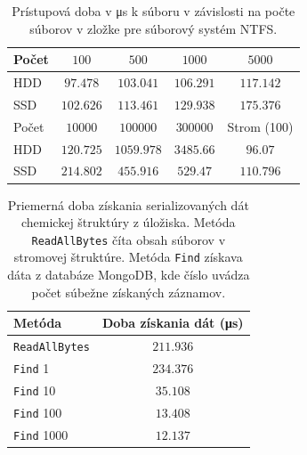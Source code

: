 \documentclass[slovak]{ExcelAtFIT} %
\begin{document}
\begin{table}[h]
	\vskip6pt
	\caption{Prístupová doba v \si{\micro\second} k súboru v závislosti na počte súborov v zložke pre súborový systém NTFS.}
	\centering
	\begin{tabular}{l|c|c|c|c}
		\toprule
		Počet & $100$ & $500$ & $1000$ & $5000$ \\
		\midrule
		HDD & $97.478$ & $103.041$ & $106.291$ & $117.142$ \\
		SSD & $102.626$ & $113.461$ & $129.938$ & $175.376$ \\
		\midrule[2px]
		Počet & $10000$ & $100000$ & $300000$ & Strom (100)\\
		\midrule
		HDD & $120.725$ & $1059.978$ & $3485.66$ & $96.07$
		 \\
		SSD & $214.802$ & $455.916$ & $529.47$ & $110.796$ \\
		\bottomrule
	\end{tabular}
	\label{tab:disk_access}
\end{table}

\begin{table}[h]
	\vskip6pt
	\caption{Priemerná doba získania serializovaných dát che\-mic\-kej štruktúry z úložiska. Metóda \texttt{ReadAllBytes} číta obsah súborov v stromovej štru\-ktú\-re. Metóda \texttt{Find} získava dáta z databáze MongoDB, kde číslo uvádza počet súbežne zí\-ska\-ný\-ch záznamov. }
	\centering
	\begin{tabular}{l|c}
		\toprule
		Metóda & Doba získania dát (\si{\micro\second})  \\
		\midrule
		\texttt{ReadAllBytes} & $211.936$ \\
		\texttt{Find} 1       & $234.376$ \\
		\texttt{Find} 10      & $35.108$ \\
		\texttt{Find} 100     & $13.408$ \\
		\texttt{Find} 1000    & $12.137$ \\
		\bottomrule
	\end{tabular}
	\label{tab:storage_benchmark}
\end{table}
\end{document}
